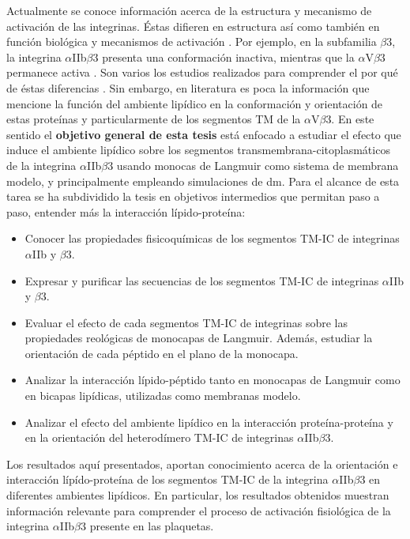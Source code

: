 Actualmente se conoce información acerca de la estructura y mecanismo de activación de las integrinas. Éstas difieren en estructura así como también en función biológica y mecanismos de activación \citep{Amaro2011, Li2017}. Por ejemplo, en la subfamilia $\beta$3, la integrina $\alpha$IIb$\beta$3 presenta una conformación inactiva, mientras que la $\alpha$V$\beta$3 permanece activa \citep{Askari2009, Kamata2005}. Son varios los estudios realizados para comprender el por qué de éstas diferencias \citep{Li2017, Li2018, Schurpf2011, Su2016}. Sin embargo, en literatura es poca la información que mencione la función del ambiente lipídico en la conformación y orientación de estas proteínas y particularmente de los segmentos TM de la $\alpha$V$\beta$3. En este sentido el \textbf{objetivo general de esta tesis} está enfocado a estudiar el efecto que induce el ambiente lipídico sobre los segmentos transmembrana-citoplasmáticos de la integrina $\alpha$IIb$\beta$3 usando monocas de Langmuir como sistema de membrana modelo, y principalmente empleando simulaciones de \ac{dm}.  Para el alcance de esta tarea se ha subdividido la tesis en objetivos intermedios que permitan paso a paso, entender más la interacción lípido-proteína:

\begin{itemize}
\item{Conocer las propiedades fisicoquímicas de los segmentos TM-IC de integrinas $\alpha$IIb y $\beta$3.}
\item{Expresar y purificar las secuencias de los segmentos TM-IC de integrinas $\alpha$IIb y $\beta$3.}
\item{Evaluar el efecto de cada segmentos TM-IC de integrinas sobre las propiedades reológicas de monocapas de Langmuir. Además, estudiar la orientación de cada péptido en el plano de la monocapa.}
\item{Analizar la interacción lípido-péptido tanto en monocapas de Langmuir como en bicapas lipídicas, utilizadas como membranas modelo.}
\item{Analizar el efecto del ambiente lipídico en la interacción proteína-proteína y en la orientación del heterodímero TM-IC de integrinas $\alpha$IIb$\beta$3.}
\end{itemize}

Los resultados aquí presentados, aportan conocimiento acerca de la orientación e interacción lípído-proteína de los segmentos TM-IC de la integrina $\alpha$IIb$\beta$3 en diferentes ambientes lipídicos. En particular, los resultados obtenidos muestran información relevante para comprender el proceso de activación fisiológica de la integrina $\alpha$IIb$\beta$3 presente en las plaquetas.

